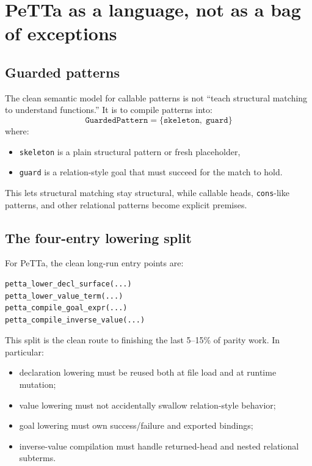 \documentclass[11pt]{article}
\begin{document}
\section{PeTTa as a language, not as a bag of exceptions}

\subsection{Guarded patterns}

The clean semantic model for callable patterns is not ``teach structural matching to understand functions.'' It is to compile patterns into:
\[
\texttt{GuardedPattern} = \{\texttt{skeleton},\; \texttt{guard}\}
\]
where:
\begin{itemize}
    \item \texttt{skeleton} is a plain structural pattern or fresh placeholder,
    \item \texttt{guard} is a relation-style goal that must succeed for the match to hold.
\end{itemize}

This lets structural matching stay structural, while callable heads, \texttt{cons}-like patterns, and other relational patterns become explicit premises.

\subsection{The four-entry lowering split}

For PeTTa, the clean long-run entry points are:
\begin{lstlisting}
petta_lower_decl_surface(...)
petta_lower_value_term(...)
petta_compile_goal_expr(...)
petta_compile_inverse_value(...)
\end{lstlisting}

This split is the clean route to finishing the last 5--15\% of parity work. In particular:
\begin{itemize}
    \item declaration lowering must be reused both at file load and at runtime mutation;
    \item value lowering must not accidentally swallow relation-style behavior;
    \item goal lowering must own success/failure and exported bindings;
    \item inverse-value compilation must handle returned-head and nested relational subterms.
\end{itemize}
\end{document}
